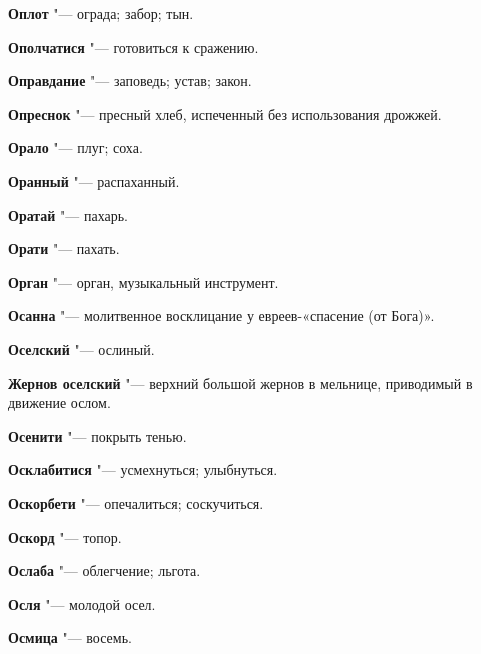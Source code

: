 \begin{mymulticols}{2}
\noindent\textbf{Оплот} "--- ограда; забор; тын. 




\noindent\textbf{Ополчатися} "--- готовиться к сражению. 




\noindent\textbf{Оправдание} "--- заповедь; устав; закон. 




\noindent\textbf{Опреснок} "--- пресный хлеб, испеченный без использования дрожжей. 




\noindent\textbf{Орало} "--- плуг; соха. 




\noindent\textbf{Оранный} "--- распаханный. 




\noindent\textbf{Оратай} "--- пахарь. 




\noindent\textbf{Орати} "--- пахать. 




\noindent\textbf{Орган} "--- орган, музыкальный инструмент. 




\noindent\textbf{Осанна} "--- молитвенное восклицание у евреев-«спасение (от Бога)». 




\noindent\textbf{Оселский} "--- ослиный. 




\noindent\textbf{Жернов оселский} "--- верхний большой жернов в мельнице, приводимый в движение ослом. 




\noindent\textbf{Осенити} "--- покрыть тенью. 




\noindent\textbf{Осклабитися} "--- усмехнуться; улыбнуться. 




\noindent\textbf{Оскорбети} "--- опечалиться; соскучиться. 




\noindent\textbf{Оскорд} "--- топор. 




\noindent\textbf{Ослаба} "--- облегчение; льгота. 




\noindent\textbf{Осля} "--- молодой осел. 




\noindent\textbf{Осмица} "--- восемь. 





\end{mymulticols}
